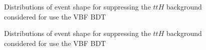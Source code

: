 \begin{figure}[htbp]

     

    \caption{Distributions of event shape for suppressing the $ttH$ background considered for use the VBF BDT}
    \label{fig:yy-focused-variables}
\end{figure}
\begin{figure}[htbp]\ContinuedFloat
        
    \caption{Distributions of event shape for suppressing the $ttH$ background considered for use the VBF BDT}
    \label{fig:yy-focused-variables}
\end{figure}
